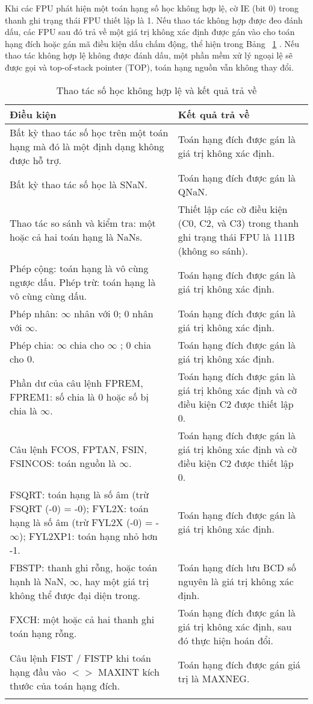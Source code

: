 	Khi các FPU phát hiện một toán hạng số học không hợp lệ, cờ IE (bit 0) trong thanh ghi trạng thái FPU thiết lập là 1. Nếu thao tác không hợp được đeo đánh dấu, các FPU sau đó trả về một giá trị không xác định được gán vào cho toán hạng đích hoặc gán mã điều kiện dấu chấm động, thể hiện trong Bảng ~\ref{tb:InvalidAr} . Nếu thao tác không hợp lệ không được đánh dấu, một phần mềm xử lý ngoại lệ sẽ được gọi và top-of-stack pointer (TOP), toán hạng nguồn vẫn không thay đổi.
		\begin{longtable}{|m{8cm}|m{8cm}|}
			\hline
				Điều kiện & Kết quả trả về\\
			\hline
			\hline
				Bất kỳ thao tác số học trên một toán hạng mà đó là một định dạng không được hỗ trợ. & Toán hạng đích được gán là giá trị không xác định. \\
			\hline
				Bất kỳ thao tác số học là SNaN. & Toán hạng đích được gán là QNaN.\\
			\hline
				Thao tác so sánh và kiểm tra: một hoặc cả hai toán hạng là NaNs. & Thiết lập các cờ điều kiện (C0, C2, và C3) trong thanh ghi trạng thái FPU là 111B (không so sánh). \\
			\hline
				Phép cộng: toán hạng là vô cùng ngược dấu.
				Phép trừ: toán hạng là vô cùng cùng dấu. & Toán hạng đích được gán là giá trị không xác định. \\
			\hline
				Phép nhân: $\mathbb{\infty}  $ nhân với 0; 0 nhân với $\mathbb{\infty}  $. & Toán hạng đích được gán là giá trị không xác định. \\
			\hline
				Phép chia: $\mathbb{\infty}  $ chia cho $\mathbb{\infty}  $ ; 0 chia cho 0. & Toán hạng đích được gán là giá trị không xác định. \\
			\hline
				Phần dư của câu lệnh FPREM, FPREM1: số chia là 0 hoặc số bị chia là  $\mathbb{\infty}  $. &Toán hạng đích được gán là giá trị không xác định và cờ điều kiện C2 được thiết lập 0. \\
			\hline
				Câu lệnh  FCOS, FPTAN, FSIN, FSINCOS: toán nguồn là $\mathbb{\infty}  $. & Toán hạng đích được gán là giá trị không xác định và cờ điều kiện C2 được thiết lập 0. \\
			\hline
			FSQRT: toán hạng là số âm (trừ FSQRT (-0) = -0);
			FYL2X: toán hạng là số âm (trừ FYL2X (-0) = -$\mathbb{\infty}  $);
			FYL2XP1: toán hạng nhỏ hơn -1. & Toán hạng đích được gán là giá trị không xác định. \\
			\hline
			FBSTP: thanh ghi rỗng, hoặc toán hạnh là  NaN, $\mathbb{\infty}  $, hay một giá trị không thể được đại diện trong. &  Toán hạng đích lưu BCD số nguyên là giá trị không xác định.\\
			\hline
				FXCH: một hoặc cả hai thanh ghi toán hạng rỗng. &  Toán hạng đích được gán là giá trị không xác định, sau đó thực hiện hoán đổi. \\
			\hline
			Câu lệnh FIST / FISTP khi toán hạng đầu vào $<>$ MAXINT  kích thước của toán hạng đích. & Toán hạng đích được gán giá trị là MAXNEG. \\
			\hline
				\caption{Thao tác số học không hợp lệ và kết quả trả về}
				\label{tb:InvalidAr}
		\end{longtable}
		
